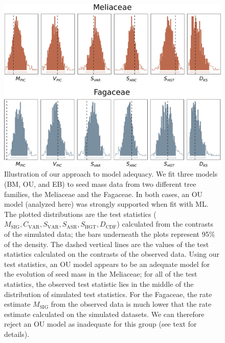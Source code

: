 \documentclass[a4paper,11pt]{article}
\begin{document}
\begin{figure}[p]
  \centering
  \includegraphics[scale=0.5]{figs/two-clade-example}
  \caption{Illustration of our approach to model adequacy. We fit three models (BM, OU, and EB) to seed mass data from two different tree families, the Meliaceae and the Fagaceae. In both cases, an OU model (analyzed here) was strongly supported when fit with ML. The plotted distributions are the test statistics ($M_{\text{SIG}}, C_{\text{VAR}}, S_{\text{VAR}}, S_{\text{ASR}}, S_{\text{HGT}}, D_{\text{CDF}}$) calculated from the contrasts of the simulated data; the bars underneath the plots represent 95\% of the density. The dashed vertical lines are the values of the test statistics calculated on the contrasts of the observed data. Using our test statistics, an OU model appears to be an adequate model for the evolution of seed mass in the Meliaceae; for all of the test statistics, the observed test statistic lies in the middle of the distribution of simulated test statistics. For the Fagaceae, the rate estimate $M_{\text{SIG}}$ from the observed data is much lower that the rate estimate calculated on the simulated datasets. We can therefore reject an OU model as inadequate for this group (see text for details).}
  \label{fig:two-clades}
\end{figure}
\end{document}
